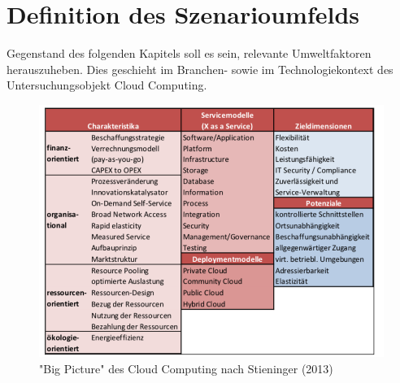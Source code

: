 \section{Definition des Szenarioumfelds}
\label{environment}

Gegenstand des folgenden Kapitels soll es sein, relevante Umweltfaktoren herauszuheben. Dies geschieht  im Branchen- sowie im Technologiekontext des Untersuchungsobjekt Cloud Computing. 

\begin{figure}[H]
	\centering
	\includegraphics[width=\linewidth]{images/bigpicture}
	\caption[Caption for parameters]{ "Big Picture" des Cloud Computing nach Stieninger (2013) \cite{stieninger}}
	\label{fig:bigpicture}
\end{figure}